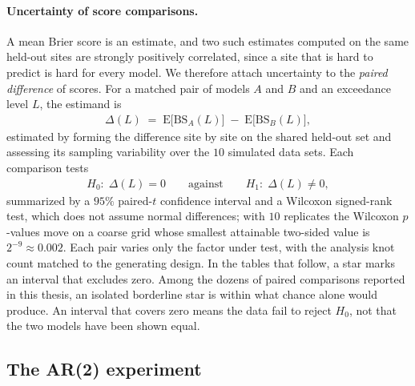 \documentclass[12pt]{article}
\begin{document}
\paragraph{Uncertainty of score comparisons.}\label{sec:sim-uq}

A mean Brier score is an estimate, and two such estimates computed on the same held-out sites are strongly positively correlated, since a site that is hard to predict is hard for every model.  We therefore attach uncertainty to the \emph{paired difference} of scores.  For a matched pair of models $A$ and $B$ and an exceedance level $L$, the estimand is
\begin{align}
  \Delta(L) \;=\; \mathrm{E}\big[\mathrm{BS}_A(L)\big] \;-\; \mathrm{E}\big[\mathrm{BS}_B(L)\big],
  \label{eq:delta-estimand}
\end{align}
estimated by forming the difference site by site on the shared held-out set and assessing its sampling variability over the $10$ simulated data sets.  Each comparison tests
\begin{align}
  H_0\!:\; \Delta(L) = 0 \qquad \text{against} \qquad H_1\!:\; \Delta(L) \neq 0,
  \label{eq:delta-null}
\end{align}
summarized by a $95\%$ paired-$t$ confidence interval and a Wilcoxon signed-rank test, which does not assume normal differences; with $10$ replicates the Wilcoxon $p$-values move on a coarse grid whose smallest attainable two-sided value is $2^{-9} \approx 0.002$.  Each pair varies only the factor under test, with the analysis knot count matched to the generating design.  In the tables that follow, a star marks an interval that excludes zero.  Among the dozens of paired comparisons reported in this thesis, an isolated borderline star is within what chance alone would produce.  An interval that covers zero means the data fail to reject $H_0$, not that the two models have been shown equal.

\subsection{The AR(2) experiment}\label{sec:sim-ar2-design}
\end{document}
